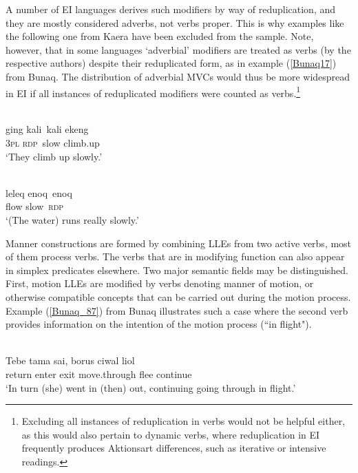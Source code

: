 A number of EI languages derives such modifiers by way of reduplication, and they are mostly considered adverbs, not verbs proper. This is why examples like the following one from Kaera have been excluded from the sample. Note, however, that in some languages `adverbial' modifiers are treated as verbs (by the respective authors) despite their reduplicated form, as in example (\ref{Bunaq17}) from Bunaq. The distribution of adverbial MVCs would thus be more widespread in EI if all instances of reduplicated modifiers were counted as verbs.\footnote{Excluding all instances of reduplication in verbs would not be helpful either, as this would also pertain to dynamic verbs, where reduplication in EI frequently produces Aktionsart differences, such as iterative or intensive readings.}

\ea 
{}\\
\gll ging kali~kali ekeng \\
3\textsc{pl} \textsc{rdp}~slow climb.up \\
\glft `They climb up slowly.'\\ 
\z

\ea \label{Bunaq17}
\\
\gll leleq enoq~enoq \\
flow slow~\textsc{rdp} \\
\glft `(The water) runs really slowly.'\\ 
\z

Manner constructions are formed by combining LLEs from two active verbs, most of them process verbs. The verbs that are in modifying function can also appear in simplex predicates elsewhere. Two major semantic fields may be distinguished. First, motion LLEs are modified by verbs denoting manner of motion, or otherwise compatible concepts that can be carried out during the motion process. Example (\ref{Bunaq_87}) from Bunaq illustrates such a case where the second verb provides information on the intention of the motion process (``in flight"). 

\ea \label{Bunaq_87}
\\
\gll Tebe tama sai, borus ciwal liol \\
return enter exit move.through flee continue \\
\glft `In turn (she) went in (then) out, continuing going through in flight.’\\ 
\z

